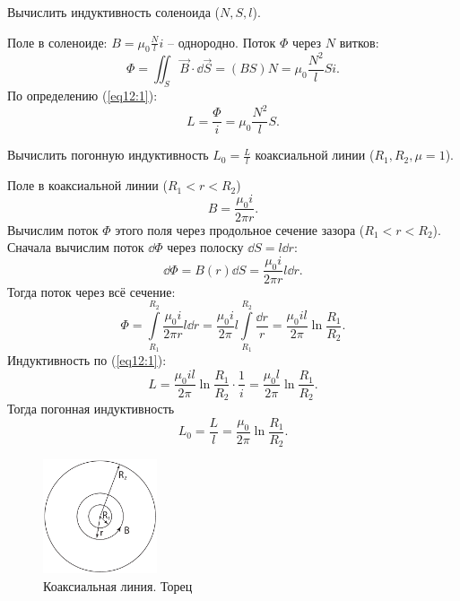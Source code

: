     \begin{example}
        Вычислить индуктивность соленоида (\( N, S, l \)).
    \end{example}
    \begin{solution}
        Поле в соленоиде: \( B = \mu_0 \frac{N}{l}i \) -- однородно. Поток 
        \( \Phi \) через \( N \) витков:
        \[
            \Phi = \iint_S \vec{B}\cdot\dd \vec{S} = (BS)N =
            \mu_0 \frac{N^2}{l}Si.
        \]
        По определению (\ref{eq12:1}):
        \[
            L = \frac{\Phi}{i} = \mu_0 \frac{N^2}{l}S.
        \]
    \end{solution}
    
    \begin{example}
        Вычислить погонную индуктивность \( L_0 = \frac{L}{l} \) коаксиальной
        линии (\( R_1, R_2, \mu = 1 \)).
    \end{example}
    \begin{solution}
        Поле в коаксиальной линии (\( R_1 < r < R_2 \))
        \[
            B = \frac{\mu_0 i}{2\pi r}.
        \]
        Вычислим поток \( \Phi \) этого поля через продольное сечение зазора
        (\( R_1 < r < R_2 \)). Сначала вычислим поток \( \dd \Phi \) через
        полоску \( \dd  S = l\dd  r \):
        \[
            \dd \Phi = B(r)\dd  S = \frac{\mu_0 i}{2\pi r}l\dd  r.
        \]
        Тогда поток через всё сечение:
        \[
            \Phi = \int\limits_{R_1}^{R_2} \frac{\mu_0 i}{2\pi r}l\dd  r = 
            \frac{\mu_0 i}{2\pi}l \int\limits_{R_1}^{R_2} \frac{\dd  r}{r} =
            \frac{\mu_0 il}{2\pi}\ln\frac{R_1}{R_2}.
        \]
        Индуктивность по (\ref{eq12:1}):
        \[
            L = \frac{\mu_0 il}{2\pi}\ln\frac{R_1}{R_2}\cdot\frac{1}{i} =
            \frac{\mu_0 l}{2\pi}\ln\frac{R_1}{R_2}.
        \]
        Тогда погонная индуктивность
        \[
            L_0 = \frac{L}{l} = \frac{\mu_0}{2\pi}\ln\frac{R_1}{R_2}.
        \]
    \end{solution}

    \begin{figure}[b!]
        \center
        \includegraphics[width=0.3\textwidth]{lec12/coaxial_line.pdf}
        \caption{Коаксиальная линия. Торец}
    \end{figure}    

